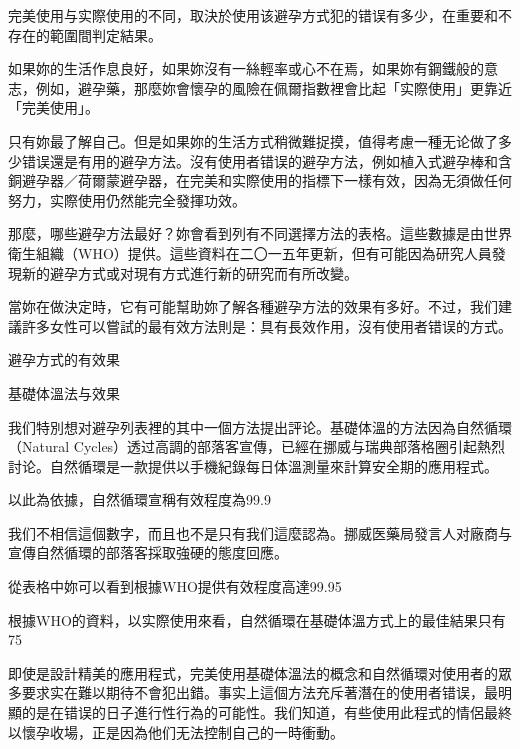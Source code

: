 \documentclass[12pt,UTF8]{ctexbook}
\begin{document}
完美使用与实際使用的不同，取決於使用该避孕方式犯的错误有多少，在重要和不存在的範圍間判定結果。

如果妳的生活作息良好，如果妳沒有一絲輕率或心不在焉，如果妳有鋼鐵般的意志，例如，避孕藥，那麼妳會懷孕的風險在佩爾指數裡會比起「实際使用」更靠近「完美使用」。

只有妳最了解自己。但是如果妳的生活方式稍微難捉摸，值得考慮一種无论做了多少错误還是有用的避孕方法。沒有使用者错误的避孕方法，例如植入式避孕棒和含銅避孕器／荷爾蒙避孕器，在完美和实際使用的指標下一樣有效，因為无須做任何努力，实際使用仍然能完全發揮功效。

那麼，哪些避孕方法最好？妳會看到列有不同選擇方法的表格。這些數據是由世界衛生組織（WHO）提供。這些資料在二〇一五年更新，但有可能因為研究人員發現新的避孕方式或对現有方式進行新的研究而有所改變。

當妳在做決定時，它有可能幫助妳了解各種避孕方法的效果有多好。不过，我们建議許多女性可以嘗試的最有效方法則是：具有長效作用，沒有使用者错误的方式。





避孕方式的有效果





基礎体溫法与效果




我们特別想对避孕列表裡的其中一個方法提出評论。基礎体溫的方法因為自然循環（Natural Cycles）透过高調的部落客宣傳，已經在挪威与瑞典部落格圈引起熱烈討论。自然循環是一款提供以手機紀錄每日体溫測量來計算安全期的應用程式。

以此為依據，自然循環宣稱有效程度為99.9%

我们不相信這個數字，而且也不是只有我们這麼認為。挪威医藥局發言人对廠商与宣傳自然循環的部落客採取強硬的態度回應。

從表格中妳可以看到根據WHO提供有效程度高達99.95%

根據WHO的資料，以实際使用來看，自然循環在基礎体溫方式上的最佳結果只有75%

即使是設計精美的應用程式，完美使用基礎体溫法的概念和自然循環对使用者的眾多要求实在難以期待不會犯出錯。事实上這個方法充斥著潛在的使用者错误，最明顯的是在错误的日子進行性行為的可能性。我们知道，有些使用此程式的情侶最終以懷孕收場，正是因為他们无法控制自己的一時衝動。
\end{document}
